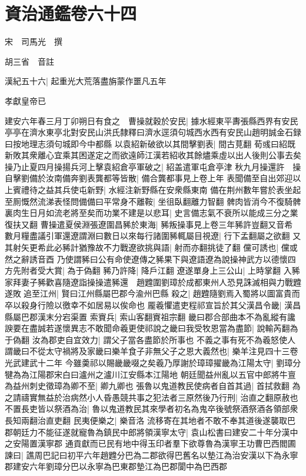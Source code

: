 \section{資治通鑑卷六十四}
宋　司馬光　撰

胡三省　音註

漢紀五十六|{
	起重光大荒落盡旃蒙作噩凡五年}


孝獻皇帝已

建安六年春三月丁卯朔日有食之　曹操就穀於安民|{
	據水經東平夀張縣西界有安民亭亭在濟水東亭北對安民山洪氏隸釋曰濟水逕須句城西水西有安民山趙明誠金石録曰按地理志須句城即今中都縣}
以袁紹新破欲以其間擊劉表|{
	間古莧翻}
荀彧曰紹既新敗其衆離心宜乘其困遂定之而欲遠師江漢若紹收其餘燼乘虛以出人後則公事去矣操乃止夏四月操揚兵河上擊袁紹倉亭軍破之|{
	紹盖遣軍屯倉亭津}
秋九月操還許　操自擊劉備於汝南備奔劉表龔都等皆散|{
	備合龔都事見上卷上年}
表聞備至自出郊迎以上賓禮待之益其兵使屯新野|{
	水經注新野縣在安衆縣東南}
備在荆州數年嘗於表坐起至厠慨然流涕表怪問備備曰平常身不離鞍|{
	坐徂臥翻離力智翻}
髀肉皆消今不復騎髀裏肉生日月如流老將至矣而功業不建是以悲耳|{
	史言備志氣不衰所以能成三分之業復扶又翻}
曹操遣夏侯淵張遼圍昌豨於東海|{
	豨叛操事見上卷三年豨許豈翻又音希}
數月糧盡議引軍還遼謂淵曰數日以來每行諸圍豨輒屬目視遼|{
	行下孟翻屬之欲翻}
又其射矢更希此必豨計猶豫故不力戰遼欲挑與語|{
	射而亦翻挑徒了翻}
儻可誘也|{
	儻或然之辭誘音酉}
乃使謂豨曰公有命使遼傳之豨果下與遼語遼為說操神武方以德懷四方先附者受大賞|{
	為于偽翻}
豨乃許降|{
	降戶江翻}
遼遂單身上三公山|{
	上時掌翻}
入豨家拜妻子豨歡喜隨遼詣操操遣豨還　趙韙圍劉璋於成都東州人恐見誅滅相與力戰韙遂敗追至江州|{
	賢曰江州縣屬巴郡今渝州巴縣}
殺之|{
	趙韙隨劉焉入蜀將以圖富貴而卒以殺身行險以徼幸不如居易以俟命也}
龎羲懼遣吏程祁宣旨於其父漢昌令畿|{
	漢昌縣屬巴郡漢末分宕渠置}
索賨兵|{
	索山客翻賨祖宗翻}
畿曰郡合部曲本不為亂縱有讒諛要在盡誠若遂懷異志不敢聞命羲更使祁說之畿曰我受牧恩當為盡節|{
	說輸芮翻為于偽翻}
汝為郡吏自宜效力|{
	謂父子當各盡節於所事也}
不義之事有死不為羲怒使人謂畿曰不從太守禍將及家畿曰樂羊食子非無父子之恩大義然也|{
	樂羊注見四十三卷光武建武十二年}
今雖羮祁以賜畿畿啜之矣羲乃厚謝於璋璋擢畿為江陽太守|{
	劉璋分犍為為江陽郡宋白曰瀘州之瀘川江安縣本江陽地}
朝廷聞益州亂以五官中郎將牛亶為益州刺史徵璋為卿不至|{
	卿九卿也}
張魯以鬼道教民使病者自首其過|{
	首拭救翻}
為之請禱實無益於治病然小人昏愚競共事之犯法者三原然後乃行刑|{
	治直之翻原赦也}
不置長吏皆以祭酒為治|{
	魯以鬼道教民其來學者初名為鬼卒後號祭酒祭酒各領部衆長知兩翻治直吏翻}
民夷便樂之|{
	樂音洛}
流移寄在其地者不敢不奉其道後遂襲取巴郡朝廷力不能征遂就寵魯為鎮民中郎將領漢寧太守|{
	袁山松書曰建安二十年分漢中之安陽置漢寧郡}
通貢獻而已民有地中得玉印者羣下欲尊魯為漢寧王功曹巴西閻圃諫曰|{
	譙周巴記曰初平六年趙韙分巴為二郡欲得巴舊名以墊江為治安漢以下為永寧郡建安六年劉璋分巴以永寧為巴東郡墊江為巴郡閬中為巴西郡}
